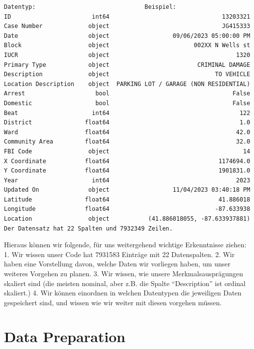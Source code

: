 \documentclass[10pt]{article}
\begin{document}
    \begin{Verbatim}[commandchars=\\\{\}]
                     Datentyp:                               Beispiel:
ID                       int64                                13203321
Case Number             object                                JG415333
Date                    object                  09/06/2023 05:00:00 PM
Block                   object                        002XX N Wells st
IUCR                    object                                    1320
Primary Type            object                         CRIMINAL DAMAGE
Description             object                              TO VEHICLE
Location Description    object  PARKING LOT / GARAGE (NON RESIDENTIAL)
Arrest                    bool                                   False
Domestic                  bool                                   False
Beat                     int64                                     122
District               float64                                     1.0
Ward                   float64                                    42.0
Community Area         float64                                    32.0
FBI Code                object                                      14
X Coordinate           float64                               1174694.0
Y Coordinate           float64                               1901831.0
Year                     int64                                    2023
Updated On              object                  11/04/2023 03:40:18 PM
Latitude               float64                               41.886018
Longitude              float64                              -87.633938
Location                object           (41.886018055, -87.633937881)
Der Datensatz hat 22 Spalten und 7932349 Zeilen.
    \end{Verbatim}

    Hieraus können wir folgende, für uns weitergehend wichtige Erkenntnisse
ziehen: 1. Wir wissen unser Code hat 7931583 Einträge mit 22
Datenspalten. 2. Wir haben eine Vorstellung davon, welche Daten wir
vorliegen haben, um unser weiteres Vorgehen zu planen. 3. Wir wissen,
wie unsere Merkmalsausprägungen skaliert sind (die meisten nominal, aber
z.B. die Spalte ``Description'' ist ordinal skaliert.) 4. Wir können
einordnen in welchen Datentypen die jeweiligen Daten gespeichert sind,
und wissen wie wir weiter mit diesen vorgehen müssen.

    \section{Data Preparation}\label{data-preparation}
\end{document}
